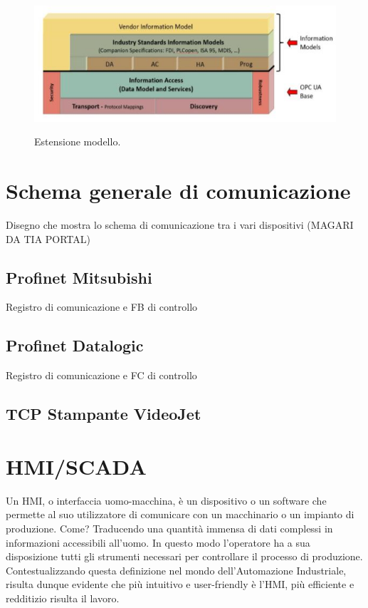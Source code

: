 \documentclass[12pt, a4paper, oneside]{book}
\begin{document}
\begin{itemize}
	\begin{figure}[H]
		\centering
		\includegraphics[width=13cm]{Immagini/OPC2}
		\label{OPC2}
		\caption{Estensione modello.}
	\end{figure}
\end{itemize}

\chapter{Schema generale di comunicazione}
Disegno che mostra lo schema di comunicazione tra i vari dispositivi (MAGARI DA TIA PORTAL)
\section{Profinet Mitsubishi}
Registro di comunicazione e FB di controllo
\section{Profinet Datalogic}
Registro di comunicazione e FC di controllo
\section{TCP Stampante VideoJet}

\chapter{HMI/SCADA}
Un HMI, o interfaccia uomo-macchina, è un dispositivo o un software che permette al suo utilizzatore di comunicare con un macchinario o un impianto di produzione. Come? Traducendo una quantità immensa di dati complessi in informazioni accessibili all’uomo. In questo modo l’operatore ha a sua disposizione tutti gli strumenti necessari per controllare il processo di produzione.
Contestualizzando questa definizione nel mondo dell’Automazione Industriale, risulta dunque evidente che più intuitivo e user-friendly è l’HMI, più efficiente e redditizio risulta il lavoro.
\end{document}
